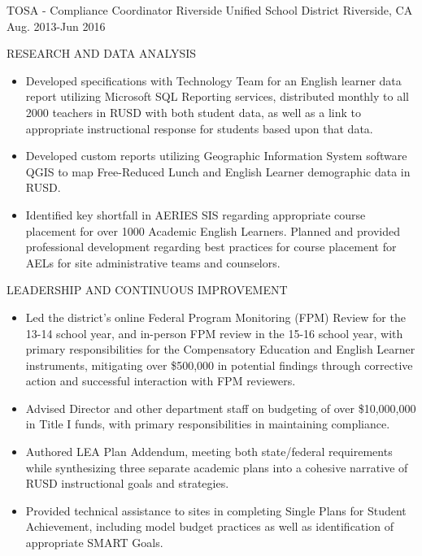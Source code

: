 \begin{cventries}
  \cventry
    {TOSA - Compliance Coordinator} %
    {Riverside Unified School District} %
    {Riverside, CA} %
    {Aug. 2013-Jun 2016} %
    {
      \begin{cvitems} %
          \item RESEARCH AND DATA ANALYSIS
          \begin{itemize}
            \item {Developed specifications with Technology Team for an English
            learner data report utilizing Microsoft SQL Reporting services,
            distributed monthly to all 2000 teachers in RUSD with both student data,
            as well as a link to appropriate instructional response for students
            based upon that data.}
            \item {Developed custom reports utilizing Geographic Information System
            software QGIS to map Free-Reduced Lunch and English Learner demographic
            data in RUSD.}
            \item {Identified key shortfall in AERIES SIS regarding appropriate
            course placement for over 1000 Academic English Learners. Planned and
            provided professional development regarding best practices for course
            placement for AELs for site administrative teams and counselors.}
          \end{itemize}
          \item LEADERSHIP AND CONTINUOUS IMPROVEMENT
          \begin{itemize}
            \item {Led the district’s online Federal Program Monitoring (FPM) Review
            for the 13-14 school year, and in-person FPM review in the 15-16 school
            year, with primary responsibilities for the Compensatory Education and
            English Learner instruments, mitigating over \$500,000 in potential
            findings through corrective action and successful interaction with FPM
            reviewers.}
            \item {Advised Director and other department staff on budgeting of over
            \$10,000,000 in Title I funds, with primary responsibilities in
            maintaining compliance.}
            \item {Authored LEA Plan Addendum, meeting both state/federal
            requirements while synthesizing three separate academic plans into a
            cohesive narrative of RUSD instructional goals and strategies.}
            \item {Provided technical assistance to sites in completing Single Plans
            for Student Achievement, including model budget practices as well as
            identification of appropriate SMART Goals.}
          \end{itemize}
      \end{cvitems}
    }



\end{cventries}
